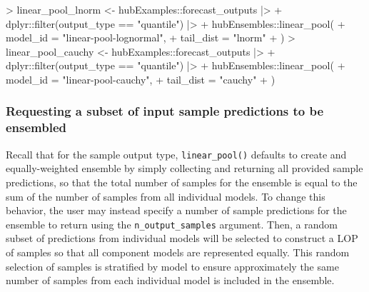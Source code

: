 \documentclass[
  letterpaper,
  DIV=11,
  numbers=noendperiod]{scrartcl}
\newenvironment{Shaded}{\begin{snugshade}}{\end{snugshade}}
\newcommand{\AttributeTok}[1]{\textcolor[rgb]{0.40,0.45,0.13}{#1}}
\newcommand{\FunctionTok}[1]{\textcolor[rgb]{0.28,0.35,0.67}{#1}}
\newcommand{\NormalTok}[1]{\textcolor[rgb]{0.00,0.23,0.31}{#1}}
\newcommand{\OtherTok}[1]{\textcolor[rgb]{0.00,0.23,0.31}{#1}}
\newcommand{\SpecialCharTok}[1]{\textcolor[rgb]{0.37,0.37,0.37}{#1}}
\newcommand{\StringTok}[1]{\textcolor[rgb]{0.13,0.47,0.30}{#1}}
\begin{document}
\begin{Shaded}
\begin{Highlighting}[]
\SpecialCharTok{\textgreater{}}\NormalTok{ linear\_pool\_lnorm }\OtherTok{\textless{}{-}}\NormalTok{ hubExamples}\SpecialCharTok{::}\NormalTok{forecast\_outputs }\SpecialCharTok{|\textgreater{}}
\SpecialCharTok{+}\NormalTok{   dplyr}\SpecialCharTok{::}\FunctionTok{filter}\NormalTok{(output\_type }\SpecialCharTok{==} \StringTok{"quantile"}\NormalTok{) }\SpecialCharTok{|\textgreater{}}
\SpecialCharTok{+}\NormalTok{   hubEnsembles}\SpecialCharTok{::}\FunctionTok{linear\_pool}\NormalTok{(}
\SpecialCharTok{+}     \AttributeTok{model\_id =} \StringTok{"linear{-}pool{-}lognormal"}\NormalTok{,}
\SpecialCharTok{+}     \AttributeTok{tail\_dist =} \StringTok{"lnorm"}
\SpecialCharTok{+}\NormalTok{   )}
\SpecialCharTok{\textgreater{}}\NormalTok{ linear\_pool\_cauchy }\OtherTok{\textless{}{-}}\NormalTok{ hubExamples}\SpecialCharTok{::}\NormalTok{forecast\_outputs }\SpecialCharTok{|\textgreater{}}
\SpecialCharTok{+}\NormalTok{   dplyr}\SpecialCharTok{::}\FunctionTok{filter}\NormalTok{(output\_type }\SpecialCharTok{==} \StringTok{"quantile"}\NormalTok{) }\SpecialCharTok{|\textgreater{}}
\SpecialCharTok{+}\NormalTok{   hubEnsembles}\SpecialCharTok{::}\FunctionTok{linear\_pool}\NormalTok{(}
\SpecialCharTok{+}     \AttributeTok{model\_id =} \StringTok{"linear{-}pool{-}cauchy"}\NormalTok{,}
\SpecialCharTok{+}     \AttributeTok{tail\_dist =} \StringTok{"cauchy"}
\SpecialCharTok{+}\NormalTok{   )}
\end{Highlighting}
\end{Shaded}

\subsubsection{Requesting a subset of input sample predictions to be
ensembled}\label{requesting-a-subset-of-input-sample-predictions-to-be-ensembled}

Recall that for the sample output type, \texttt{linear\_pool()} defaults
to create and equally-weighted ensemble by simply collecting and
returning all provided sample predictions, so that the total number of
samples for the ensemble is equal to the sum of the number of samples
from all individual models. To change this behavior, the user may
instead specify a number of sample predictions for the ensemble to
return using the \texttt{n\_output\_samples} argument. Then, a random
subset of predictions from individual models will be selected to
construct a LOP of samples so that all component models are represented
equally. This random selection of samples is stratified by model to
ensure approximately the same number of samples from each individual
model is included in the ensemble.
\end{document}
